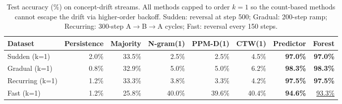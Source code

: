 \begin{table}[h]
\centering
\caption{Test accuracy (\%) on concept-drift streams. All methods capped to order $k=1$ so the count-based methods cannot escape the drift via higher-order backoff. Sudden: reversal at step 500; Gradual: 200-step ramp; Recurring: $300$-step A$\to$B$\to$A cycles; Fast: reversal every 150 steps.}
\label{tab:drift_accuracy}
\begin{tabular}{lrrrrrrr}
\toprule
Dataset & Persistence & Majority & N-gram(1) & PPM-D(1) & CTW(1) & Predictor & Forest \\
\midrule
Sudden (k=1) & 2.0\% & 33.5\% & 2.5\% & 2.5\% & 4.5\% & \textbf{97.0\%} & \textbf{97.0\%} \\
Gradual (k=1) & 0.8\% & 32.9\% & 5.0\% & 5.0\% & 6.2\% & \textbf{98.3\%} & \textbf{98.3\%} \\
Recurring (k=1) & 1.2\% & 33.3\% & 3.8\% & 3.3\% & 4.2\% & \textbf{97.5\%} & \textbf{97.5\%} \\
Fast (k=1) & 1.2\% & 25.8\% & 40.0\% & 39.6\% & 40.4\% & \textbf{94.6\%} & \underline{93.3\%} \\
\bottomrule
\end{tabular}
\end{table}
